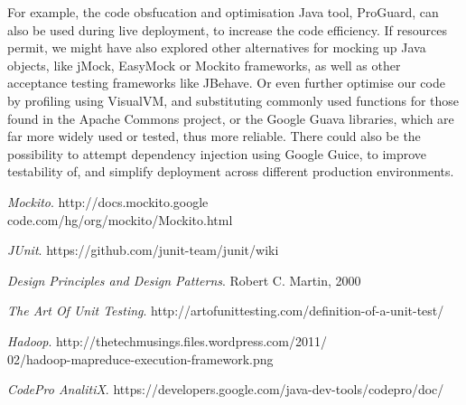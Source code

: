 \documentclass[11pt,twocolumn]{article} %
\begin{document}
For example, the code obsfucation and optimisation Java tool, ProGuard, can also be used
during live deployment, to increase the code efficiency. If resources permit, we might have
also explored other alternatives for mocking up Java objects, like jMock, EasyMock or
Mockito frameworks, as well as other acceptance testing frameworks like JBehave.
Or even further optimise our code by profiling using VisualVM, and substituting commonly
used functions for those found in the Apache Commons project, or the Google Guava
libraries, which are far more widely used or tested, thus more reliable. There could also be
the possibility to attempt dependency injection using Google Guice, to improve testability
of, and simplify deployment across different production environments.


\begin{thebibliography}{9}

  \emph{Mockito}.
  http://docs.mockito.google\\code.com/hg/org/mockito/Mockito.html  

  \emph{JUnit}.
  https://github.com/junit-team/junit/wiki

  \emph{Design Principles and Design Patterns}.
  Robert C. Martin,
  2000

  \emph{The Art Of Unit Testing}.
  http://artofunittesting.com/definition-of-a-unit-test/

  \emph{Hadoop}.
  http://thetechmusings.files.wordpress.com/2011/\\02/hadoop-mapreduce-execution-framework.png
  
  \emph{CodePro AnalitiX}.
  https://developers.google.com/java-dev-tools/codepro/doc/ 
  
\end{thebibliography}
\end{document}
